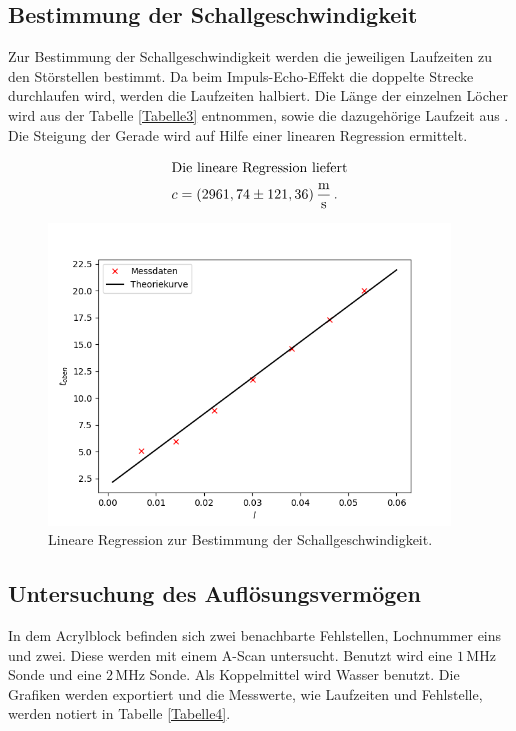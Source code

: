 \subsection{Bestimmung der Schallgeschwindigkeit}

\begin{flushleft}
    Zur Bestimmung der Schallgeschwindigkeit werden die jeweiligen Laufzeiten zu den Störstellen bestimmt.
    Da beim Impuls-Echo-Effekt die doppelte Strecke durchlaufen wird, werden die Laufzeiten halbiert.
    Die Länge der einzelnen Löcher wird aus der Tabelle \ref{Tabelle3} entnommen, sowie die dazugehörige Laufzeit aus \cite{a2}.
    Die Steigung der Gerade wird auf Hilfe einer linearen Regression ermittelt.
\end{flushleft}

\begin{align*}
    \intertext{Die lineare Regression liefert}
    c = (2961,74 \pm 121,36)\,\frac{\unit{\meter}}{\unit{\second}}\,.
\end{align*}

\begin{figure}[H] 
    \centering
    \includegraphics[height=80mm]{bilder/schall.png}
    \caption{Lineare Regression zur Bestimmung der Schallgeschwindigkeit.\label{Abbildung6} }
\end{figure}

\subsection{Untersuchung des Auflösungsvermögen}

\begin{flushleft}
    In dem Acrylblock befinden sich zwei benachbarte Fehlstellen, Lochnummer eins und zwei. 
    Diese werden mit einem A-Scan untersucht. 
    Benutzt wird eine $ 1\,\unit{\mega\hertz} $ Sonde und eine $ 2\,\unit{\mega\hertz} $ Sonde.
    Als Koppelmittel wird Wasser benutzt. 
    Die Grafiken werden exportiert und die Messwerte, wie Laufzeiten und Fehlstelle, werden notiert in Tabelle \ref{Tabelle4}.
\end{flushleft}


